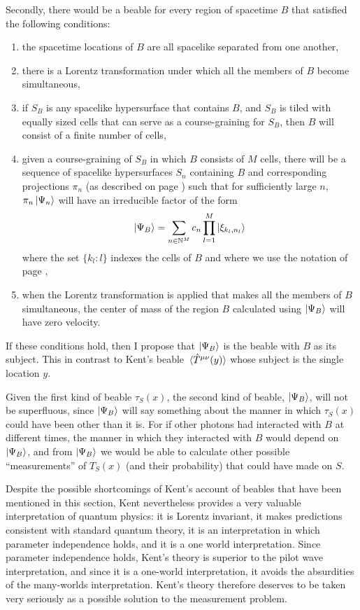 Secondly, there would be a beable for every region of spacetime $B$ that satisfied the following conditions:
\begin{enumerate}
\item  the spacetime locations of $B$ are all spacelike separated from one another,
\item there is a Lorentz transformation under which all the members of $B$ become simultaneous,
\item  if $S_B$ is any spacelike hypersurface that contains $B$, and $S_B$ is tiled with equally sized cells that can serve as a course-graining for $S_B$, then $B$ will consist of a finite number of cells,
\item given a course-graining of $S_B$ in which $B$ consists of $M$ cells, there will be a sequence of spacelike hypersurfaces $S_n$ containing $B$ and corresponding projections $\pi_n$ (as described on page \pageref{tauprojection})  such that for sufficiently large $n$,  $\pi_n\ket{\Psi_n}$ will have an irreducible factor of the form
$$
\ket{\Psi_B}=\sum_{n\in\mathbb{N}^M} c_{n}\prod_{l=1}^{M}\ket{\xi_{k_{l},n_l}}
$$
where the set $\{k_l:l\}$ indexes the cells of $B$ and where we use the notation of  page \pageref{Sistate},
\item when the Lorentz transformation is applied that makes all the members of $B$ simultaneous,  the center of mass of the region $B$ calculated using $\ket{\Psi_B}$ will have zero velocity.
\end{enumerate}
If these conditions hold, then I propose that $\ket{\Psi_B}$ is the beable with $B$ as its subject. This in contrast to Kent's beable $\ev*{\hat{T}^{\mu\nu}(y)}$ whose subject is the single location $y$.

Given the first kind of beable $\tau_S(x)$, the second kind of beable, $\ket{\Psi_B}$, will not be superfluous, since $\ket{\Psi_B}$ will say something about the manner in which  $\tau_S(x)$ could have been other than it is. For if other photons had interacted with $B$ at different times, the manner in which they interacted with $B$ would depend on $\ket{\Psi_B}$, and from $\ket{\Psi_B}$ we would be able to calculate other possible ``measurements'' of $T_S(x)$ (and their probability) that could have made on $S$.

Despite the possible shortcomings of Kent's account of beables that have been mentioned in this section, Kent nevertheless provides a very valuable interpretation of quantum physics: it is Lorentz invariant, it makes predictions consistent with standard quantum theory, it is an interpretation in which parameter independence holds, and it is a one world interpretation. Since parameter independence holds, Kent's theory is superior to the pilot wave interpretation, and since it is a one-world interpretation, it avoids the absurdities of the many-worlds interpretation. Kent's theory therefore deserves to be taken very seriously as a possible solution to the measurement problem.

\nocite{Shimony93}
\nocite{Bell}
